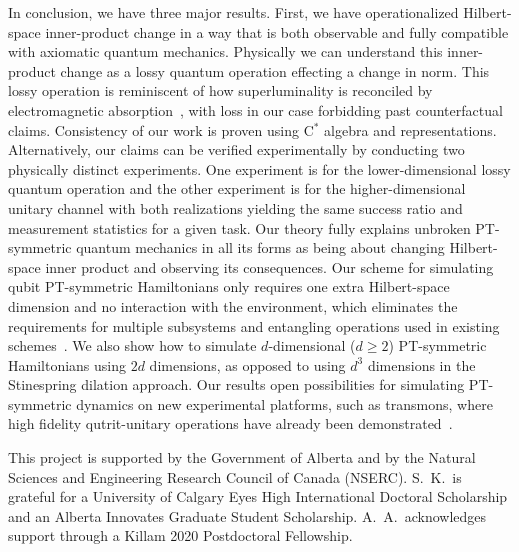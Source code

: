 \documentclass[amsmath,amssymb,aps,pra,superscriptaddress,twocolumn]{revtex4-2}
\begin{document}
In conclusion, we have three major results.
First, we have operationalized Hilbert-space inner-product change in a way that is both observable and fully compatible with axiomatic quantum mechanics. 
Physically we can understand this inner-product change as 
a lossy quantum operation effecting a change in norm.
This lossy operation
is reminiscent of how superluminality is reconciled by electromagnetic absorption~\cite{SKC93},
with loss in our case forbidding past counterfactual claims.
Consistency of our work is proven using C$^*$ algebra and representations.
Alternatively,
our claims can be verified experimentally by conducting two physically distinct experiments.
One experiment is for the lower-dimensional lossy quantum operation 
and the other experiment is for the higher-dimensional unitary channel with both realizations yielding the same success ratio and 
measurement statistics for a given task.
Our theory fully explains unbroken PT-symmetric quantum mechanics in all its forms as being about changing Hilbert-space inner product and observing its consequences.
Our scheme for simulating qubit PT-symmetric Hamiltonians 
only requires one extra Hilbert-space dimension and no interaction with the environment,
which eliminates the requirements for 
multiple subsystems and entangling operations used in existing schemes~\cite{GS08a,WLG+19,TWY+16,WLG+19,XWZ+19,GZL+21}.
We also show how to simulate $d$-dimensional ($d\geq 2$) PT-symmetric Hamiltonians using
$2d$ dimensions, as opposed to using $d^3$ dimensions in the Stinespring dilation approach.
Our results open possibilities for simulating PT-symmetric dynamics on new experimental platforms, 
such as transmons, where high fidelity qutrit-unitary operations have already been demonstrated~\cite{BRS+20,KYSL20}. 



\acknowledgements 
This project is supported by the Government of Alberta and 
by the Natural Sciences and Engineering Research Council of Canada (NSERC).
S.\ K.\ is grateful for a University of Calgary Eyes High International Doctoral Scholarship and an Alberta Innovates Graduate Student Scholarship.
A.\ A.\ acknowledges support through a Killam 2020 Postdoctoral Fellowship.
\end{document}
